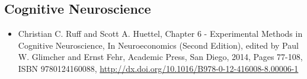 \documentclass[12pt,article,oneside,a4paper]{memoir}
\begin{document}
\subsection{Cognitive Neuroscience}
\begin{itemize}
\item Christian C. Ruff and Scott A. Huettel, Chapter 6 - Experimental Methods in Cognitive Neuroscience, In Neuroeconomics (Second Edition), edited by Paul W. Glimcher and Ernst Fehr, Academic Press, San Diego, 2014, Pages 77-108, ISBN 9780124160088, \url{http://dx.doi.org/10.1016/B978-0-12-416008-8.00006-1}
\end{itemize}
\end{document}
